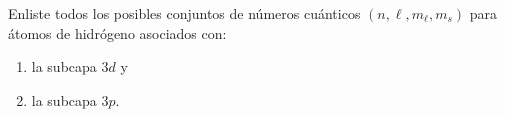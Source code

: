 \item Enliste todos los posibles conjuntos de números cuánticos $(n, \ell, m_{\ell}, m_s)$ para átomos de hidrógeno asociados con:
\begin{enumerate}
    \item la subcapa $3d$ y
    \item la subcapa $3p$.
\end{enumerate}